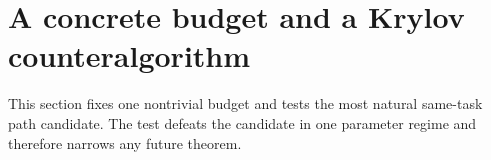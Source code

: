 \section{A concrete budget and a Krylov counteralgorithm}
\label{sec:finite-krylov-cap}

This section fixes one nontrivial budget and tests the most natural
same-task path candidate.  The test defeats the candidate in one parameter
regime and therefore narrows any future theorem.
